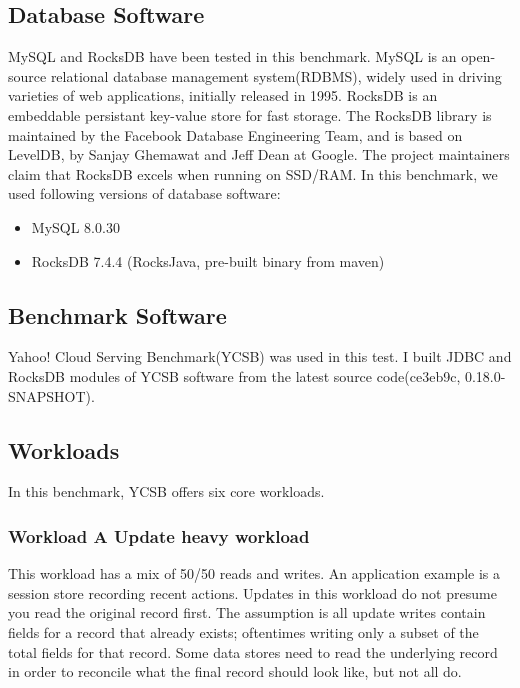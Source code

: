 \documentclass[journal]{IEEEtran}
\begin{document}
\subsection{Database Software}

MySQL and RocksDB have been tested in this benchmark. MySQL is an open-source relational database management system(RDBMS), widely used in driving varieties of web applications, initially released in 1995. RocksDB is an embeddable persistant key-value store for fast storage. The RocksDB library is maintained by the Facebook Database Engineering Team, and is based on LevelDB, by Sanjay Ghemawat and Jeff Dean at Google.\cite{ref1} The project maintainers claim that RocksDB excels when running on SSD/RAM. In this benchmark, we used following versions of database software:

\begin{itemize}
\item MySQL 8.0.30
\item RocksDB 7.4.4 (RocksJava, pre-built binary from maven)
\end{itemize}

\subsection{Benchmark Software}

Yahoo! Cloud Serving Benchmark(YCSB) was used in this test. I built JDBC and RocksDB modules of YCSB software from the latest source code(ce3eb9c, 0.18.0-SNAPSHOT).

\subsection{Workloads}

In this benchmark, YCSB offers six core workloads.\cite{ref2}

\subsubsection{Workload A Update heavy workload}

This workload has a mix of 50/50 reads and writes. An application example is a session store recording recent actions. Updates in this workload do not presume you read the original record first. The assumption is all update writes contain fields for a record that already exists; oftentimes writing only a subset of the total fields for that record. Some data stores need to read the underlying record in order to reconcile what the final record should look like, but not all do.
\end{document}
